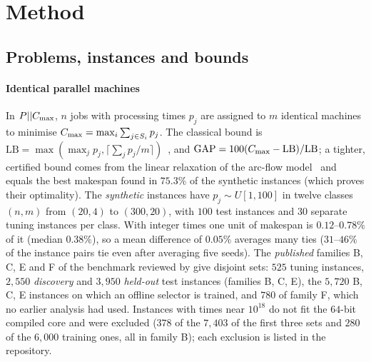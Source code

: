 \section{Method}
\label{sec:method}

\subsection{Problems, instances and bounds}
\label{sec:instances}
\paragraph{Identical parallel machines} In $P||C_{\max}$, $n$ jobs with processing times $p_j$ are assigned to $m$ identical machines to minimise $C_{\max}=\max_i\sum_{j\in S_i}p_j$. The classical bound is $\mathrm{LB}=\max(\max_jp_j,\lceil\sum_jp_j/m\rceil)$~\cite{Graham1969}, and $\mathrm{GAP}=100(C_{\max}-\mathrm{LB})/\mathrm{LB}$; a tighter, certified bound comes from the linear relaxation of the arc-flow model~\cite{MradSouayah2018} and equals the best makespan found in $75.3\%$ of the synthetic instances (which proves their optimality). The \emph{synthetic} instances have $p_j\sim U[1,100]$ in twelve classes $(n,m)$ from $(20,4)$ to $(300,20)$, with $100$ test instances and $30$ separate tuning instances per class. With integer times one unit of makespan is $0.12$--$0.78\%$ of it (median $0.38\%$), so a mean difference of $0.05\%$ averages many ties ($31$--$46\%$ of the instance pairs tie even after averaging five seeds). The \emph{published} families B, C, E and F of the benchmark reviewed by \citet{OstojicEtAl2025} give disjoint sets: $525$ tuning instances, $2{,}550$ \emph{discovery} and $3{,}950$ \emph{held-out} test instances (families B, C, E), the $5{,}720$ B, C, E instances on which an offline selector is trained, and $780$ of family F, which no earlier analysis had used. Instances with times near $10^{18}$ do not fit the $64$-bit compiled core and were excluded ($378$ of the $7{,}403$ of the first three sets and $280$ of the $6{,}000$ training ones, all in family B); each exclusion is listed in the repository.

